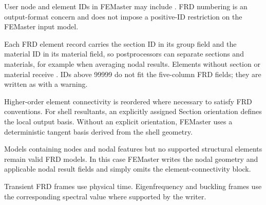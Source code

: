 User node and element IDs in FEMaster may include . FRD numbering is an output-format concern and does not impose a positive-ID restriction on the FEMaster input model.

Each FRD element record carries the section ID in its group field and the material ID in its material field, so postprocessors can separate sections and materials, for example when averaging nodal results. Elements without section or material receive . IDs above 99999 do not fit the five-column FRD fields; they are written as  with a warning.

Higher-order element connectivity is reordered where necessary to satisfy FRD conventions. For shell resultants, an explicitly assigned Section orientation defines the local output basis. Without an explicit orientation, FEMaster uses a deterministic tangent basis derived from the shell geometry.

Models containing nodes and nodal features but no supported structural elements remain valid FRD models. In this case FEMaster writes the nodal geometry and applicable nodal result fields and simply omits the element-connectivity block.

Transient FRD frames use physical time. Eigenfrequency and buckling frames use the corresponding spectral value where supported by the writer.
